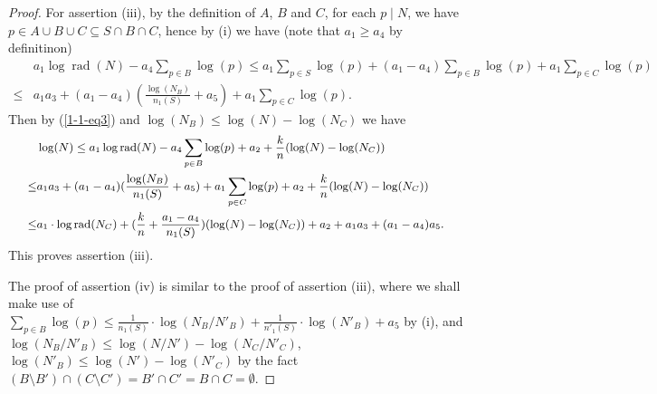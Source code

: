 \documentclass[a4paper, 12pt]{article}
\DeclareMathOperator{\rad}{\text{rad}}
\numberwithin{equation}{section}
\theoremstyle{definition}
\begin{document}
\begin{proof}
For assertion (iii), by the definition of $A$, $B$ and $C$, for each $p\mid N$, we have $p\in A\cup B\cup C \subseteq S\cap B \cap C$, hence by (i) we have (note that $a_1\ge a_4$ by definitinon)
\small\begin{align*}
&a_1 \log\rad(N) - a_4  \sum_{p\in B}\log(p) 
\le a_1\sum_{p\in S}\log(p) + (a_1-a_4)\sum_{p\in B}\log(p) + a_1\sum_{p\in C} \log(p)
\\ \le& a_1 a_3 +  (a_1-a_4)(\frac{\log(N_B)}{n_1(S)}  + a_5) + a_1\sum_{p\in C} \log(p).
\end{align*}\normalsize
Then by (\ref{1-1-eq3})  and  $\log(N_B) \le \log(N) - \log(N_C)$   we have  
\begin{equation*} \small
\begin{aligned}
& \log(N) \le   a_1 \log\rad(N) - a_4  \sum_{p\in B}\log(p)  + a_2 + \frac{k}{n}(\log(N) - \log(N_C) )
\\ \le & a_1 a_3 + (a_1-a_4)(\frac{\log(N_B)}{n_1(S)}  + a_5) + a_1\sum_{p\in C} \log(p) + a_2 + \frac{k}{n}(\log(N) - \log(N_C) )
\\ \le& a_1\cdot\log\rad(N_C) + (\frac{k}{n}+ \frac{a_1-a_4}{n_1(S)})(\log(N)-\log(N_C))
+ a_2 + a_1a_3 + (a_1-a_4)a_5 .
\end{aligned}
\end{equation*}
This proves assertion (iii).

The proof of assertion (iv) is similar to the proof of assertion (iii), where we shall make use of $\sum_{p\in B} \log(p) \le \frac{1}{n_1(S)} \cdot \log(N_B/N'_B) +  \frac{1}{n'_1(S)} \cdot \log(N'_B) + a_5$ by (i), and $\log(N_B/N'_B) \le \log(N/N') - \log(N_C/N'_C)$, $\log(N'_B) \le \log(N') - \log(N'_C)$ by the fact $(B\setminus B') \cap (C\setminus C') = B'\cap C' = B \cap C = \emptyset$.
\end{proof}
\end{document}
